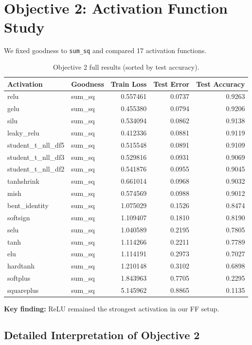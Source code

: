 \documentclass[sigconf]{acmart}
\begin{document}
\section{Objective 2: Activation Function Study}
We fixed goodness to \texttt{sum\_sq} and compared 17 activation functions.

\begin{table}[t]
\caption{Objective 2 full results (sorted by test accuracy).}
\label{tab:obj2}
\centering
\scriptsize
\begin{tabular}{l l r r r}
\toprule
Activation & Goodness & Train Loss & Test Error & Test Accuracy \\
\midrule
relu & sum\_sq & 0.557461 & 0.0737 & 0.9263 \\
gelu & sum\_sq & 0.455380 & 0.0794 & 0.9206 \\
silu & sum\_sq & 0.534094 & 0.0862 & 0.9138 \\
leaky\_relu & sum\_sq & 0.412336 & 0.0881 & 0.9119 \\
student\_t\_nll\_df5 & sum\_sq & 0.515548 & 0.0891 & 0.9109 \\
student\_t\_nll\_df3 & sum\_sq & 0.529816 & 0.0931 & 0.9069 \\
student\_t\_nll\_df2 & sum\_sq & 0.541876 & 0.0955 & 0.9045 \\
tanhshrink & sum\_sq & 0.661014 & 0.0968 & 0.9032 \\
mish & sum\_sq & 0.574569 & 0.0988 & 0.9012 \\
bent\_identity & sum\_sq & 1.075029 & 0.1526 & 0.8474 \\
softsign & sum\_sq & 1.109407 & 0.1810 & 0.8190 \\
selu & sum\_sq & 1.040589 & 0.2195 & 0.7805 \\
tanh & sum\_sq & 1.114266 & 0.2211 & 0.7789 \\
elu & sum\_sq & 1.114191 & 0.2973 & 0.7027 \\
hardtanh & sum\_sq & 1.210148 & 0.3102 & 0.6898 \\
softplus & sum\_sq & 1.843963 & 0.7705 & 0.2295 \\
squareplus & sum\_sq & 5.145962 & 0.8865 & 0.1135 \\
\bottomrule
\end{tabular}
\end{table}

\textbf{Key finding:} ReLU remained the strongest activation in our FF setup.

\subsection{Detailed Interpretation of Objective 2}
\end{document}
